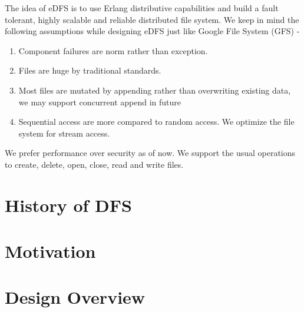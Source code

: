 \documentclass[a4paper,12pt]{article}
\begin{document}
The idea of eDFS is to use Erlang distributive capabilities and build a fault tolerant, highly scalable and reliable distributed file system. We keep in mind the following assumptions while designing eDFS just like Google File System (GFS) \cite{ghemawat03} -
\begin{enumerate}
\item Component failures are norm rather than exception.
\item Files are huge by traditional standards.
\item Most files are mutated by appending rather than overwriting existing data, we may support concurrent append in future
\item Sequential access are more compared to random access. We optimize the file system for stream access.
\end{enumerate}

We prefer performance over security as of now. We support the usual operations to create, delete, open, close, read and write files.

\section{History of DFS}

\section{Motivation}

\section{Design Overview}
\end{document}
